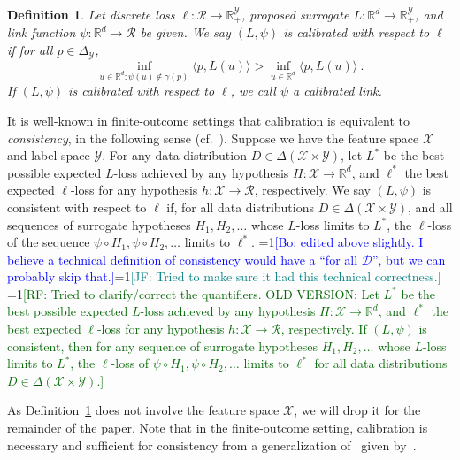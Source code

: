 \documentclass[11pt]{article}
\newcommand{\Comments}{1}
\newcommand{\mynote}[2]{\ifnum\Comments=1\textcolor{#1}{#2}\fi}
\newcommand{\raf}[1]{\mynote{darkgreen}{[RF: #1]}}
\newcommand{\jessie}[1]{\mynote{teal}{[JF: #1]}}
\newcommand{\bo}[1]{\mynote{blue}{[Bo: #1]}}
\newcommand{\reals}{\mathbb{R}}
\newcommand{\simplex}{\Delta_\Y}
\newcommand{\D}{\mathcal{D}}
\newcommand{\R}{\mathcal{R}}
\newcommand{\X}{\mathcal{X}}
\newcommand{\Y}{\mathcal{Y}}
\newcommand{\inprod}[2]{\langle #1, #2 \rangle}%
\newtheorem{definition}{Definition}
\begin{document}
\begin{definition}
  \label{def:calibrated}
  Let discrete loss $\ell:\R\to\reals^\Y_+$, proposed surrogate $L:\reals^d\to\reals^\Y_+$, and link function $\psi:\reals^d\to\R$ be given.
  We say $(L,\psi)$ is \emph{calibrated} with respect to $\ell$ if
for all $p \in \simplex$,
  \begin{equation}
    \label{eq:calibrated}
  \inf_{u \in \reals^d : \psi(u) \not\in \gamma(p)} \inprod{p}{L(u)} > \inf_{u \in \reals^d} \inprod{p}{L(u)}~.
  \end{equation}
  If $(L, \psi)$ is calibrated with respect to $\ell$, we call $\psi$ a \emph{calibrated link.}
\end{definition}
It is well-known in finite-outcome settings that calibration is equivalent to \emph{consistency}, in the following sense (cf.~\citep{bartlett2006convexity,zhang2004statistical,agarwal2015consistent}).
Suppose we have the feature space $\X$ and label space $\Y$.
For any data distribution $D \in \Delta(\X \times \Y)$, let $L^*$ be the best possible expected $L$-loss achieved by any hypothesis $H:\X\to\reals^d$, and $\ell^*$ the best expected $\ell$-loss for any hypothesis $h:\X\to\R$, respectively.
We say $(L,\psi)$ is consistent with respect to $\ell$ if, for all data distributions $D \in \Delta(\X \times \Y)$, and all sequences of surrogate hypotheses $H_1,H_2,\ldots$ whose $L$-loss limits to $L^*$, the $\ell$-loss of the sequence $\psi\circ H_1,\psi \circ H_2, \ldots$ limits to $\ell^*$.
\bo{edited above slightly. I believe a technical definition of consistency would have a ``for all $\D$'', but we can probably skip that.}\jessie{Tried to make sure it had this technical correctness.}
\raf{Tried to clarify/correct the quantifiers.  OLD VERSION:
Let $L^*$ be the best possible expected $L$-loss achieved by any hypothesis $H:\X\to\reals^d$, and $\ell^*$ the best expected $\ell$-loss for any hypothesis $h:\X\to\R$, respectively.
If $(L,\psi)$ is consistent, then for any sequence of surrogate hypotheses $H_1,H_2,\ldots$ whose $L$-loss limits to $L^*$, the $\ell$-loss of $\psi\circ H_1,\psi \circ H_2, \ldots$ limits to $\ell^*$ for all data distributions $D \in \Delta(\X \times \Y)$.}

As Definition~\ref{def:calibrated} does not involve the feature space $\X$, we will drop it for the remainder of the paper.
Note that in the finite-outcome setting, calibration is necessary and sufficient for consistency from a generalization of~\citet{tewari2007consistency} given by~\citet{ramaswamy2016convex}.  
\end{document}
